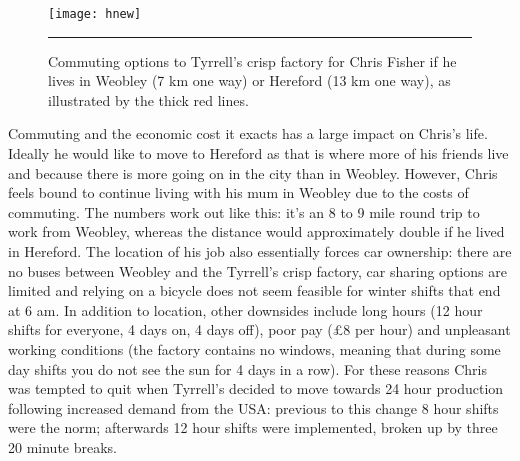 \begin{figure}[htbp]
  \centerline{
    \texttt{[image: hnew]}}
    \rule{35em}{0.5pt}
  \caption[Commuting options to Tyrrell's crisp factory]{Commuting options to
Tyrrell's crisp factory for Chris Fisher if he lives in Weobley (7 km one way)
or Hereford (13 km one way), as illustrated by the thick red lines.}
  \label{fig:hereford}
\end{figure}

Commuting and the economic cost it exacts has a large impact on Chris's life.
Ideally he would like to move to Hereford as that is where more of his
friends live and because there is more going on in the city than in Weobley.
However, Chris feels
bound to continue living with his mum in Weobley due to the costs of commuting.
The numbers work out like this: it's an 8 to 9 mile round trip to work from
Weobley, whereas the distance would approximately double if he lived in Hereford.
The location of his job also essentially forces car ownership: there are no buses
between Weobley and the Tyrrell's crisp factory, car sharing options are limited
and relying on a bicycle does not seem feasible for winter shifts that end at 6 am.
In addition to location, other downsides include long hours (12 hour shifts for
everyone, 4 days on, 4 days off), poor pay (\pounds8 per hour) and unpleasant
working conditions (the factory contains no windows, meaning that during
some day shifts you do not see the sun for 4 days in a row). For these reasons
Chris was tempted to quit when Tyrrell's decided to move towards 24 hour
production following increased demand from the USA: previous to this change
8 hour shifts were the norm; afterwards 12 hour shifts were implemented, broken up by
three 20 minute breaks.
% 
% 


